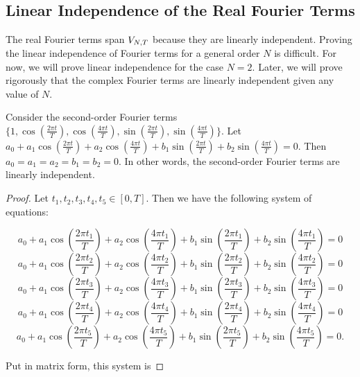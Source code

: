 \subsection{Linear Independence of the Real Fourier Terms}

\par \indentt The real Fourier terms span $V_{N,T}$ because they are linearly independent. Proving the linear independence of Fourier terms for a general order $N$ is difficult. For now, we will prove linear independence for the case $N = 2$. Later, we will prove rigorously that the complex Fourier terms are linearly independent given any value of $N$.

\begin{theorem}
    Consider the second-order Fourier terms $\{1,\cos(\frac{2\pi t}{T}),\cos(\frac{4\pi t}{T}),\sin(\frac{2\pi t}{T}),\sin(\frac{4\pi t}{T})\}$. Let $a_0 + a_1\cos(\frac{2\pi t}{T}) + a_2\cos(\frac{4\pi t}{T}) + b_1\sin(\frac{2\pi t}{T}) + b_2\sin(\frac{4\pi t}{T}) = 0$. Then $a_0 = a_1 = a_2 = b_1 = b_2 = 0$. In other words, the second-order Fourier terms are linearly independent.
    
    \begin{proof}
        Let $t_1,t_2,t_3,t_4,t_5\in [0,T]$. Then we have the following system of equations:
        
        $$a_0 + a_1\cos(\frac{2\pi t_1}{T}) + a_2\cos(\frac{4\pi t_1}{T}) + b_1\sin(\frac{2\pi t_1}{T}) + b_2\sin(\frac{4\pi t_1}{T}) = 0$$
        $$a_0 + a_1\cos(\frac{2\pi t_2}{T}) + a_2\cos(\frac{4\pi t_2}{T}) + b_1\sin(\frac{2\pi t_2}{T}) + b_2\sin(\frac{4\pi t_2}{T}) = 0$$
        $$a_0 + a_1\cos(\frac{2\pi t_3}{T}) + a_2\cos(\frac{4\pi t_3}{T}) + b_1\sin(\frac{2\pi t_3}{T}) + b_2\sin(\frac{4\pi t_3}{T}) = 0$$
        $$a_0 + a_1\cos(\frac{2\pi t_4}{T}) + a_2\cos(\frac{4\pi t_4}{T}) + b_1\sin(\frac{2\pi t_4}{T}) + b_2\sin(\frac{4\pi t_4}{T}) = 0$$
        $$a_0 + a_1\cos(\frac{2\pi t_5}{T}) + a_2\cos(\frac{4\pi t_5}{T}) + b_1\sin(\frac{2\pi t_5}{T}) + b_2\sin(\frac{4\pi t_5}{T}) = 0.$$
        
        \par \bigskip Put in matrix form, this system is
        

\end{proof}
\end{theorem}
